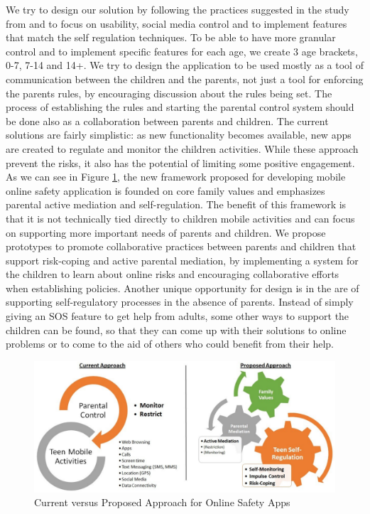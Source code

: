 We try to design our solution by following the practices suggested in the study from \citep{wisniewski2017parental} and to focus on usability, social media control and to implement features that match the self regulation techniques. To be able to have more granular control and to implement specific features for each age, we create 3 age brackets, 0-7, 7-14 and 14+. We try to design the application to be used mostly as a tool of communication between the children and the parents, not just a tool for enforcing the parents rules, by encouraging discussion about the rules being set. The process of establishing the rules and starting the parental control system should be done also as a collaboration between parents and children. The current solutions are fairly simplistic: as new functionality becomes available, new apps are created to regulate and monitor the children activities. While these approach prevent the risks, it also has the potential of limiting some positive engagement. As we can see in Figure \ref{fig:current-vs-proposed}, the new framework proposed for developing mobile online safety application is founded on core family values and emphasizes parental active mediation and self-regulation. The benefit of this framework is that it is not technically tied directly to children mobile activities and can focus on supporting more important needs of parents and children. We propose prototypes to promote collaborative practices between parents and children that support risk-coping and active parental mediation, by implementing a system for the children to learn about online risks and encouraging collaborative efforts when establishing policies. Another unique opportunity for design is in the are of supporting self-regulatory processes in the absence of parents. Instead of simply giving an SOS feature to get help from adults, some other ways to support the children can be found, so that they can come up with their solutions to online problems or to come to the aid of others who could benefit from their help.

\begin{figure}[th]
\centering
\includegraphics[width=1\textwidth]{Figures/current-vs-proposed}
\decoRule
\caption{Current versus Proposed Approach for Online Safety Apps}
\label{fig:current-vs-proposed}
\end{figure}

